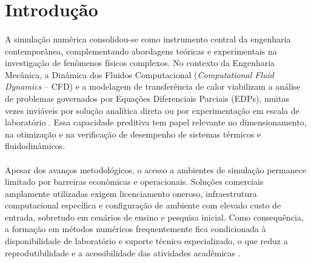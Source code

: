 \section{Introdução}
\label{sec:introducao}

\paragraph{}A simulação numérica consolidou-se como instrumento central da engenharia contemporânea, complementando abordagens teóricas e experimentais na investigação de fenômenos físicos complexos. No contexto da Engenharia Mecânica, a Dinâmica dos Fluidos Computacional (\textit{Computational Fluid Dynamics} -- CFD) e a modelagem de transferência de calor viabilizam a análise de problemas governados por Equações Diferenciais Parciais (EDPs), muitas vezes inviáveis por solução analítica direta ou por experimentação em escala de laboratório \cite{Maliska2004}. Essa capacidade preditiva tem papel relevante no dimensionamento, na otimização e na verificação de desempenho de sistemas térmicos e fluidodinâmicos.

\paragraph{}Apesar dos avanços metodológicos, o acesso a ambientes de simulação permanece limitado por barreiras econômicas e operacionais. Soluções comerciais amplamente utilizadas exigem licenciamento oneroso, infraestrutura computacional específica e configuração de ambiente com elevado custo de entrada, sobretudo em cenários de ensino e pesquisa inicial. Como consequência, a formação em métodos numéricos frequentemente fica condicionada à disponibilidade de laboratório e suporte técnico especializado, o que reduz a reprodutibilidade e a acessibilidade das atividades acadêmicas \cite{Anjos2024}.

